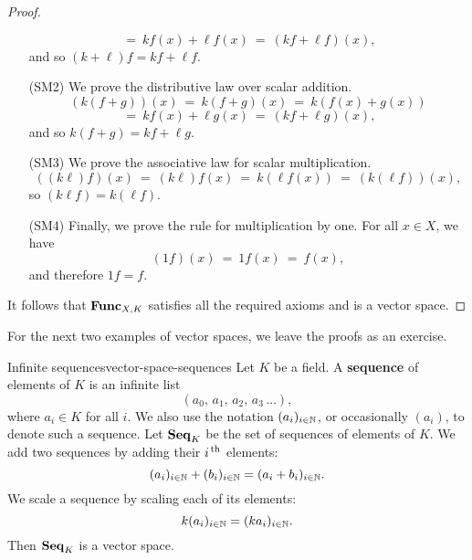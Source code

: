 \begin{proof}
\begin{itemize}
\begin{equation*}
      ~=~ kf(x) + \ell f(x)
      ~=~ (kf + \ell f) (x),
    \end{equation*}
    and so $(k + \ell ) f=kf + \ell f$.
  \item[(SM2)] We prove the distributive law over scalar addition.
    \begin{equation*}
      (k(f + g)) (x)
      ~=~ k(f + g) (x)
      ~=~ k(f(x) + g(x))
    \end{equation*}
    \begin{equation*}
      ~=~ kf(x) + \ell g(x)
      ~=~ (kf + \ell g) (x),
    \end{equation*}
    and so $k(f + g) = kf + \ell g$.
  \item[(SM3)] We prove the associative law for scalar multiplication.
    \begin{equation*}
      ((k\ell ) f) (x)
      ~=~ (k\ell) f(x)
      ~=~ k(\ell f(x))
      ~=~ (k(\ell f)) (x),
    \end{equation*}
    so $(k\ell f) =k(\ell f)$.
  \item[(SM4)] Finally, we prove the rule for multiplication by one.
    For all $x\in X$, we have
    \begin{equation*}
      (1f) ( x) ~=~ 1f(x) ~=~f(x),
    \end{equation*}
    and therefore $1f=f$.
  \end{itemize}

  It follows that $\mathbf{Func}_{X,K}$ satisfies all the required axioms and is a
  vector space.
\end{proof}

For the next two examples of vector spaces, we leave the proofs as an
exercise.

\begin{example}{Infinite sequences}{vector-space-sequences}
  Let $K$ be a field. A \textbf{sequence}%
   of elements of $K$ is an infinite list
  \begin{equation*}
    (a_0,\,a_1,\,a_2,\,a_3\, \ldots),
  \end{equation*}
  where $a_i\in K$ for all $i$. We also use the notation
  $(a_i)_{i\in\mathbb{N}}$, or occasionally $(a_i)$, to denote such a
  sequence. Let $\mathbf{Seq}_K$ be the set of sequences%
   of elements of $K$. We add two
  sequences by adding their $i^{\,\rm th}$ elements:
  \begin{equation*}
    (a_i)_{i\in\mathbb{N}} + (b_i)_{i\in\mathbb{N}} = (a_i+b_i)_{i\in\mathbb{N}}.
  \end{equation*}
  We scale a sequence by scaling each of its elements:
  \begin{equation*}
    k(a_i)_{i\in\mathbb{N}} = (ka_i)_{i\in\mathbb{N}}.
  \end{equation*}
  Then $\mathbf{Seq}_K$ is a vector space.
\end{example}

